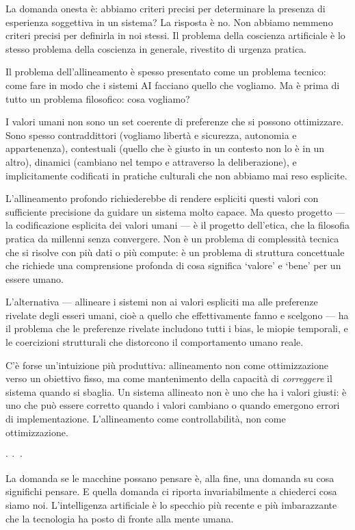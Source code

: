 \documentclass[12pt,a4paper,openany]{book}
\newcommand{\sezione}[1]{\vspace{1.2em}{\large\bfseries #1}\vspace{0.5em}\par}
\newcommand{\puntini}{\begin{center}$\cdot\ \cdot\ \cdot$\end{center}\vspace{0.3em}}
\begin{document}
La domanda onesta è: abbiamo criteri precisi per determinare la presenza di esperienza soggettiva in un sistema? La risposta è no. Non abbiamo nemmeno criteri precisi per definirla in noi stessi. Il problema della coscienza artificiale è lo stesso problema della coscienza in generale, rivestito di urgenza pratica.

\sezione{L'allineamento come problema filosofico}

Il problema dell'allineamento è spesso presentato come un problema tecnico: come fare in modo che i sistemi AI facciano quello che vogliamo. Ma è prima di tutto un problema filosofico: cosa vogliamo?

I valori umani non sono un set coerente di preferenze che si possono ottimizzare. Sono spesso contraddittori (vogliamo libertà e sicurezza, autonomia e appartenenza), contestuali (quello che è giusto in un contesto non lo è in un altro), dinamici (cambiano nel tempo e attraverso la deliberazione), e implicitamente codificati in pratiche culturali che non abbiamo mai reso esplicite.

L'allineamento profondo richiederebbe di rendere espliciti questi valori con sufficiente precisione da guidare un sistema molto capace. Ma questo progetto --- la codificazione esplicita dei valori umani --- è il progetto dell'etica, che la filosofia pratica da millenni senza convergere. Non è un problema di complessità tecnica che si risolve con più dati o più compute: è un problema di struttura concettuale che richiede una comprensione profonda di cosa significa `valore' e `bene' per un essere umano.

L'alternativa --- allineare i sistemi non ai valori espliciti ma alle preferenze rivelate degli esseri umani, cioè a quello che effettivamente fanno e scelgono --- ha il problema che le preferenze rivelate includono tutti i bias, le miopie temporali, e le coercizioni strutturali che distorcono il comportamento umano reale.

C'è forse un'intuizione più produttiva: allineamento non come ottimizzazione verso un obiettivo fisso, ma come mantenimento della capacità di \textit{correggere} il sistema quando si sbaglia. Un sistema allineato non è uno che ha i valori giusti: è uno che può essere corretto quando i valori cambiano o quando emergono errori di implementazione. L'allineamento come controllabilità, non come ottimizzazione.

\puntini

La domanda se le macchine possano pensare è, alla fine, una domanda su cosa significhi pensare. E quella domanda ci riporta invariabilmente a chiederci cosa siamo noi. L'intelligenza artificiale è lo specchio più recente e più imbarazzante che la tecnologia ha posto di fronte alla mente umana.
\end{document}
